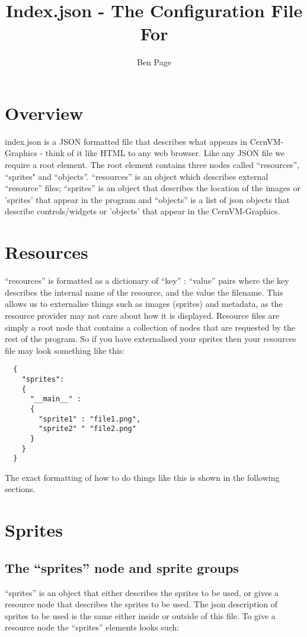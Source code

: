 \documentclass[a4paper]{article}
\title{Index.json - The Configuration File For \cernvmgraphics{}}
\author{Ben Page}
\newcommand{\cernvmgraphics}{CernVM-Graphics}
\newcommand{\json}{JSON}
\begin{document}
\maketitle

\section{Overview}
  index.json is a \json{} formatted file that describes what appears in
  \cernvmgraphics{} - think of it like HTML to any web browser. Like any
  \json{} file we require a root element.  The root element contains three 
  nodes called ``resources'', ``sprites" and ``objects''. ``resources'' is 
  an object which describes external ``resource'' files; ``sprites'' is an 
  object that describes the location of the images or 'sprites' that 
  appear in the program and ``objects'' is a list of json objects that 
  describe controls/widgets or 'objects' that appear in the 
  \cernvmgraphics{}.

\section{Resources}
  ``resources'' is formatted as a dictionary of ``key'' : ``value'' pairs 
  where the key describes the internal name of the resource, and the value 
  the filename. This allows us to externalise things such as images 
  (sprites) and metadata, as the resource provider may not care about how
  it is displayed. Resource files are simply a root node that contains
  a collection of nodes that are requested by the rest of the program. So
  if you have externalised your sprites then  your resources file may look
  something like this:

  \begin{verbatim}
  {
    "sprites":
    {
      "__main__" : 
      {
        "sprite1" : "file1.png",
        "sprite2" " "file2.png"
      }
    }
  }
  \end{verbatim}

  The exact formatting of how to do things like this is shown in the 
  following sections.

\section{Sprites}
  \subsection{The ``sprites'' node and sprite groups}
  ``sprites'' is an object that either describes the sprites to be used, or
  gives a resource node that describes the sprites to be used. The json
  description of sprites to be used is the same either inside or outside of
  this file. To give a resource node the ``sprites'' elements looks such:
\end{document}
